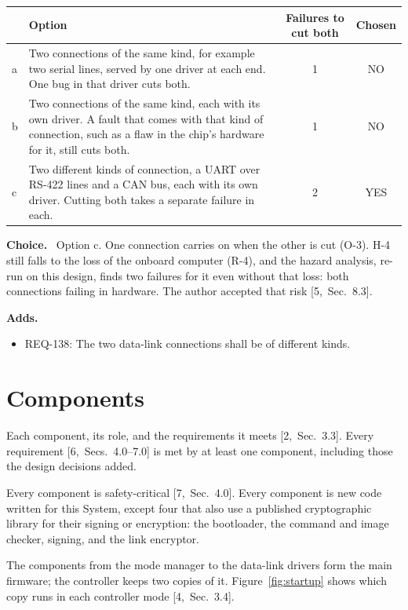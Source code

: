 \documentclass[11pt,a4paper]{article}
\newcommand{\field}[1]{\par\needspace{4\baselineskip}\smallskip\noindent\textbf{#1.}~}
\begin{document}
\smallskip
{\small\noindent\begin{tabularx}{\textwidth}{@{}l>{\raggedright\arraybackslash}Xcc@{}}
\toprule
 & Option & Failures to cut both & Chosen \\
\midrule
a & Two connections of the same kind, for example two serial lines, served by one driver at each end. One bug in that driver cuts both. & 1 & NO \\
b & Two connections of the same kind, each with its own driver. A fault that comes with that kind of connection, such as a flaw in the chip's hardware for it, still cuts both. & 1 & NO \\
c & Two different kinds of connection, a UART over RS-422 lines and a CAN bus, each with its own driver. Cutting both takes a separate failure in each. & 2 & YES \\
\bottomrule
\end{tabularx}}


\field{Choice} Option c. One connection carries on when the other is
cut (O-3). H-4 still falls to the loss of the onboard computer (R-4), and the
hazard analysis, re-run on this design, finds two failures for it even without
that loss: both connections failing in hardware. The author accepted that risk
[5,~Sec.~8.3].

\field{Adds}
\begin{itemize}
\item REQ-138: The two data-link connections shall be of different kinds.
\end{itemize}

\section{Components}
\label{sec:components}
Each component, its role, and the requirements it meets [2,~Sec.~3.3].
Every requirement [6,~Secs.~4.0--7.0] is met by at least one component,
including those the design decisions added.

Every component is safety-critical [7,~Sec.~4.0]. Every component is new code
written for this System, except four that also use a published cryptographic
library for their signing or encryption: the bootloader, the command and image
checker, signing, and the link encryptor.

The components from the mode manager to the data-link drivers form the main
firmware; the controller keeps two copies of it. Figure~\ref{fig:startup}
shows which copy runs in each controller mode [4,~Sec.~3.4].
\end{document}
